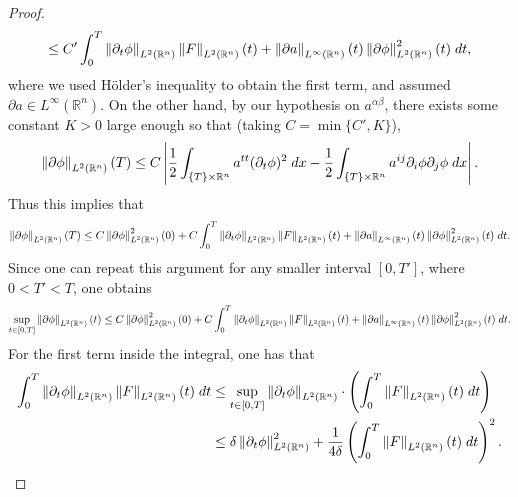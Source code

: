 \documentclass{article}
\numberwithin{equation}{section}
\begin{document}
\begin{proof}
\begin{multline*}
			\leq 
			C'\int_{0}^{T}\left\Vert \partial_{t}\phi \right\Vert_{L^{2}(\mathbb{R}^{n})}\left\Vert F \right\Vert_{L^{2}(\mathbb{R}^{n})}(t) + \left\Vert \partial a \right\Vert_{L^{\infty}(\mathbb{R}^{n})}(t)\left\Vert \partial \phi \right\Vert^{2}_{L^{2}(\mathbb{R}^{n})}(t)\;dt, 
		\end{multline*}
		where we used H\"older's inequality to obtain the first term, and assumed $\partial a \in L^{\infty}(\mathbb{R}^{n})$. 
		On the other hand, by our hypothesis on $a^{\alpha\beta}$, there exists some constant $K > 0$ large enough so that (taking $C = \min\{C',K\}$),
		\begin{equation*}
			\left\Vert \partial \phi \right\Vert_{L^{2}(\mathbb{R}^{n})}(T) \leq C\left| \frac{1}{2}\int_{\{T\} \times \mathbb{R}^{n}}a^{tt}(\partial_{t}\phi)^{2}\;dx - \frac{1}{2}\int_{\{T\} \times \mathbb{R}^{n}}a^{ij}\partial_{i}\phi\partial_{j}\phi\;dx \right|. 
		\end{equation*}
		Thus this implies that 
		\begin{multline*}
			\left\Vert \partial \phi \right\Vert_{L^{2}(\mathbb{R}^{n})}(T) \leq C\left\Vert \partial \phi \right\Vert_{L^{2}(\mathbb{R}^{n})}^{2}(0) + C\int_{0}^{T}\left\Vert \partial_{t}\phi \right\Vert_{L^{2}(\mathbb{R}^{n})}\left\Vert F \right\Vert_{L^{2}(\mathbb{R}^{n})}(t) + \left\Vert \partial a \right\Vert_{L^{\infty}(\mathbb{R}^{n})}(t)\left\Vert \partial \phi \right\Vert^{2}_{L^{2}(\mathbb{R}^{n})}(t)\;dt. 
		\end{multline*}
		Since one can repeat this argument for any smaller interval $[0, T']$, where $0 < T' < T$, one obtains 
		\begin{multline*}
			\sup_{t \in [0,T]}\left\Vert \partial \phi \right\Vert_{L^{2}(\mathbb{R}^{n})}(t) \leq C\left\Vert \partial \phi \right\Vert_{L^{2}(\mathbb{R}^{n})}^{2}(0) + C\int_{0}^{T}\left\Vert \partial_{t}\phi \right\Vert_{L^{2}(\mathbb{R}^{n})}\left\Vert F \right\Vert_{L^{2}(\mathbb{R}^{n})}(t) + \left\Vert \partial a \right\Vert_{L^{\infty}(\mathbb{R}^{n})}(t)\left\Vert \partial \phi \right\Vert^{2}_{L^{2}(\mathbb{R}^{n})}(t)\;dt. 
		\end{multline*}
		For the first term inside the integral, one has that 
		\begin{align*}
			\begin{split}
				\int_{0}^{T}\norm{\partial_{t}\phi}_{L^{2}(\mathbb{R}^{n})}\norm{F}_{L^{2}(\mathbb{R}^{n})}(t)\;dt &\leq \sup_{t \in [0,T]}\norm{\partial_{t}\phi}_{L^{2}(\mathbb{R}^{n})} \cdot \left(\int_{0}^{T}\norm{F}_{L^{2}(\mathbb{R}^{n})}(t)\;dt\right)\\
				&\leq \delta\norm{\partial_{t}\phi}_{L^{2}(\mathbb{R}^{n})}^{2} + \frac{1}{4\delta}\left(\int_{0}^{T}\norm{F}_{L^{2}(\mathbb{R}^{n})}(t)\;dt\right)^{2}. 
			\end{split}

\end{align*}
\end{proof}
\end{document}
